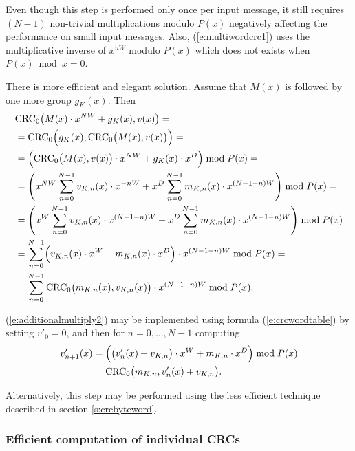 \documentclass{article}
\begin{document}
Even though this step is performed only once per input message, it still
requires $(N-1)$ non-trivial multiplications modulo $P(x)$ negatively
affecting the performance on small input messages. Also,
(\ref{e:multiwordcrc1}) uses the multiplicative inverse of $x^{nW}$ modulo
$P(x)$ which does not exists when $P(x) \bmod x = 0$.

There is more efficient and elegant solution. Assume that $M(x)$ is
followed by one more group $g_K(x)$. Then
  \begin{align}
    & {\rm CRC}_0\bigl(M(x) \cdot x^{NW} + g_K(x), v(x)\bigr) = \nonumber \\
    & = {\rm CRC}_0\Bigl(g_K(x), {\rm CRC}_0\bigl(M(x), v(x)\bigr)\Bigr) = \nonumber \\
    & = \Bigl({\rm CRC}_0\bigl(M(x), v(x)\bigr) \cdot x^{NW} + g_K(x) \cdot x^D \Bigr) \bmod P(x) = \nonumber \\
    & = \left(x^{NW} \sum_{n=0}^{N-1} v_{K, n}(x) \cdot x^{-nW} + x^D \sum_{n=0}^{N-1} m_{K, n}(x) \cdot x^{(N-1-n)W} \right) \bmod P(x) = \nonumber \\
    & = \left(x^{W} \sum_{n=0}^{N-1} v_{K, n}(x) \cdot x^{(N-1-n)W} + x^D \sum_{n=0}^{N-1} m_{K, n}(x) \cdot x^{(N-1-n)W} \right) \bmod P(x) \nonumber \\
    & = \sum_{n=0}^{N-1} \Bigl( v_{K, n}(x) \cdot x^{W} + m_{K, n}(x) \cdot x^D\Bigr) \cdot x^{(N-1-n)W} \bmod P(x) = \label{e:additionalmultiply} \\
    & = \sum_{n=0}^{N-1} {\rm CRC}_0\bigl(m_{K, n}(x), v_{K, n}(x)\bigr) \cdot x^{(N-1-n)W} \bmod P(x). \label{e:additionalmultiply2}
  \end{align}

(\ref{e:additionalmultiply2}) may be implemented using formula
(\ref{e:crcwordtable}) by setting $v'_0 = 0$, and then for $n = 0, \ldots,
N-1$ computing
  \begin{align*}
    v'_{n+1}(x)
      &= \Bigl(\bigl(v'_n(x) + v_{K, n}\bigr) \cdot x^W + m_{K, n} \cdot x^D\Bigr) \bmod P(x) \\
      &= {\rm CRC}_0\bigl(m_{K,n}, v'_n(x) + v_{K, n} \bigr).
  \end{align*}

Alternatively, this step may be performed using the less efficient
technique described in section \ref{s:crcbyteword}.


\subsubsection{Efficient computation of individual CRCs} \label{s:compute}
\end{document}
